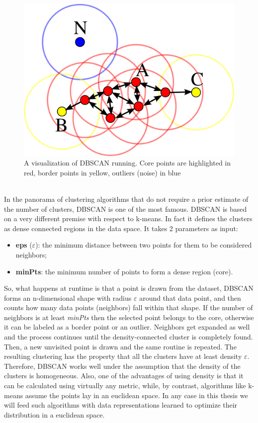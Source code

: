 \begin{figure}[b!]
    \centering
    \includegraphics[width=\textwidth]{./pictures/dbscan}
    \caption{A visualization of DBSCAN running. Core points are highlighted in red, border points in yellow, outliers (noise) in blue}
    \label{fig:unet}
\end{figure}\\
\noindent In the panorama of clustering algorithms that do not require a prior estimate of the number of clusters, DBSCAN \cite{ester1996density} is one of the most famous. DBSCAN is based on a very different premise with respect to k-means. In fact it defines the clusters as dense connected regions in the data space. It takes 2 parameters as input:
\begin{itemize}
  \item \textbf{eps} ($\varepsilon$): the minimum distance between two points for them to be considered neighbors;
  \item \textbf{minPts}: the minimum number of points to form a dense region (core).
\end{itemize}
So, what happens at runtime is that a point is drawn from the dataset, DBSCAN forms an n-dimensional shape with radius $\varepsilon$ around that data point, and then counts how many data points (neighbors) fall within that shape. If the number of neighbors is at least \textit{minPts} then the selected point belongs to the core, otherwise it can be labeled as a border point or an outlier. Neighbors get expanded as well and the process continues until the density-connected cluster is completely found. Then, a new unvisited point is drawn and the same routine is repeated. The resulting clustering has the property that all the clusters have at least density $\varepsilon$. Therefore, DBSCAN works well under the assumption that the density of the clusters is homogeneous. Also, one of the advantages of using density is that it can be calculated using virtually any metric, while, by contrast, algorithms like k-means assume the points lay in an euclidean space. In any case in this thesis we will feed such algorithms with data representations learned to optimize their distribution in a euclidean space.

